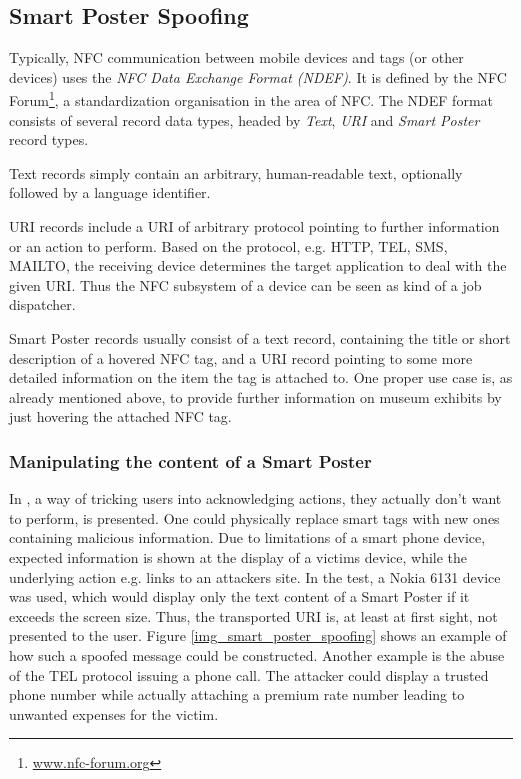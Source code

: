 \documentclass[12pt,a4paper]{article}
\begin{document}
\subsection{Smart Poster Spoofing}

Typically, NFC communication between mobile devices and tags (or other devices) uses the \emph{NFC Data Exchange Format (NDEF)}. It is defined by the NFC Forum\footnote{\url{www.nfc-forum.org}}, a standardization organisation in the area of NFC. The NDEF format consists of several record data types, headed by \emph{Text}, \emph{URI} and \emph{Smart Poster} record types.\cite{DBLP:conf/IEEEares/Mulliner09}\cite{DBLP:conf/mobisys/GummesonPGTZ13}

Text records simply contain an arbitrary, human-readable text, optionally followed by a language identifier.

URI records include a URI of arbitrary protocol pointing to further information or an action to perform. Based on the protocol, e.g. HTTP, TEL, SMS, MAILTO, the receiving device determines the target application to deal with the given URI. Thus the NFC subsystem of a device can be seen as kind of a job dispatcher.

Smart Poster records usually consist of a text record, containing the title or short description of a hovered NFC tag, and a URI record pointing to some more detailed information on the item the tag is attached to. One proper use case is, as already mentioned above, to provide further information on museum exhibits by just hovering the attached NFC tag.

\subsubsection{Manipulating the content of a Smart Poster}

In \cite{DBLP:conf/IEEEares/Mulliner09}, a way of tricking users into acknowledging actions, they actually don't want to perform, is presented. One could physically replace smart tags with new ones containing malicious information. Due to limitations of a smart phone device, expected information is shown at the display of a victims device, while the underlying action e.g. links to an attackers site. In the test, a Nokia 6131 device was used, which would display only the text content of a Smart Poster if it exceeds the screen size. Thus, the transported URI is, at least at first sight, not presented to the user. Figure \ref{img_smart_poster_spoofing} shows an example of how such a spoofed message could be constructed. Another example is the abuse of the TEL protocol issuing a phone call. The attacker could display a trusted phone number while actually attaching a premium rate number leading to unwanted expenses for the victim.
\end{document}
